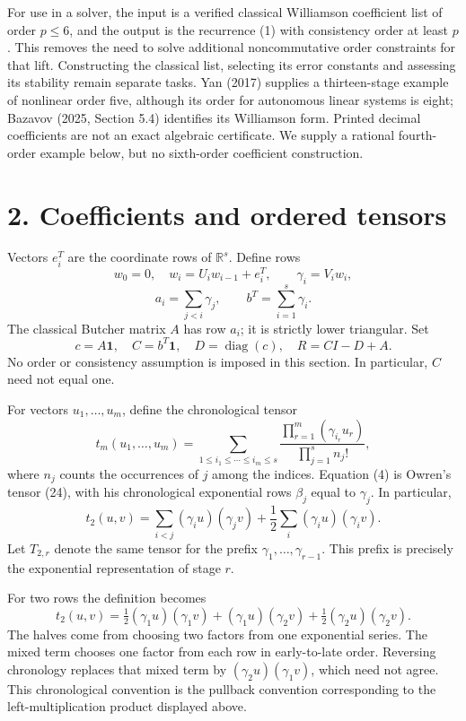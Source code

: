 \documentclass[
  11pt,
  a4paper,
]{scrartcl}
\begin{document}
For use in a solver, the input is a verified classical Williamson
coefficient list of order \(p\leq6\), and the output is the recurrence
(1) with consistency order at least \(p\). This removes the need to
solve additional noncommutative order constraints for that lift.
Constructing the classical list, selecting its error constants and
assessing its stability remain separate tasks. Yan (2017) supplies a
thirteen-stage example of nonlinear order five, although its order for
autonomous linear systems is eight; Bazavov (2025, Section 5.4)
identifies its Williamson form. Printed decimal coefficients are not an
exact algebraic certificate. We supply a rational fourth-order example
below, but no sixth-order coefficient construction.

\section{2. Coefficients and ordered
tensors}\label{coefficients-and-ordered-tensors}

Vectors \(e_i^T\) are the coordinate rows of \(\mathbb R^s\). Define
rows \[
w_0=0,\quad w_i=U_iw_{i-1}+e_i^T,
\qquad \gamma_i=V_iw_i,
\] \[
a_i=\sum_{j<i}\gamma_j,
\qquad b^T=\sum_{i=1}^s\gamma_i.
\tag{2}
\] The classical Butcher matrix \(A\) has row \(a_i\); it is strictly
lower triangular. Set \[
c=A\mathbf1,\quad C=b^T\mathbf1,\quad D=\operatorname{diag}(c),\quad R=CI-D+A.
\tag{3}
\] No order or consistency assumption is imposed in this section. In
particular, \(C\) need not equal one.

For vectors \(u_1,\ldots,u_m\), define the chronological tensor \[
t_m(u_1,\ldots,u_m)=
\sum_{1\leq i_1\leq\cdots\leq i_m\leq s}
\frac{\prod_{r=1}^m(\gamma_{i_r}u_r)}{\prod_{j=1}^s n_j!},
\tag{4}
\] where \(n_j\) counts the occurrences of \(j\) among the indices.
Equation (4) is Owren's tensor (24), with his chronological exponential
rows \(\beta_j\) equal to \(\gamma_j\). In particular, \[
t_2(u,v)=\sum_{i<j}(\gamma_i u)(\gamma_jv)
+\frac12\sum_i(\gamma_i u)(\gamma_i v).
\tag{5}
\] Let \(T_{2,r}\) denote the same tensor for the prefix
\(\gamma_1,\ldots,\gamma_{r-1}\). This prefix is precisely the
exponential representation of stage \(r\).

For two rows the definition becomes \[
t_2(u,v)=\tfrac12(\gamma_1u)(\gamma_1v)
+(\gamma_1u)(\gamma_2v)
+\tfrac12(\gamma_2u)(\gamma_2v).
\] The halves come from choosing two factors from one exponential
series. The mixed term chooses one factor from each row in early-to-late
order. Reversing chronology replaces that mixed term by
\((\gamma_2u)(\gamma_1v)\), which need not agree. This chronological
convention is the pullback convention corresponding to the
left-multiplication product displayed above.
\end{document}
